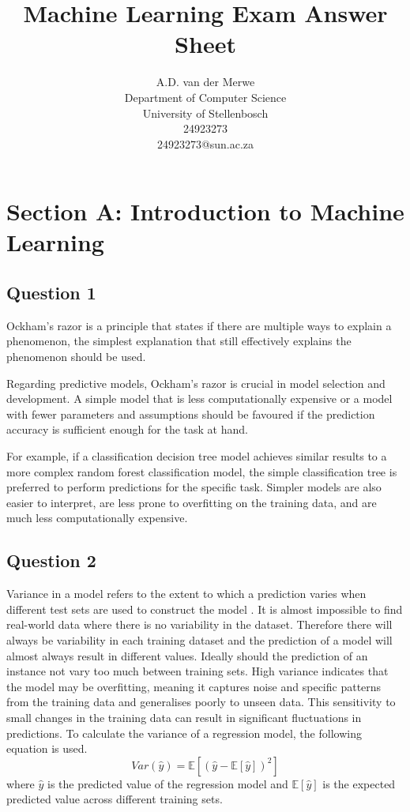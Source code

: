 \documentclass[10pt]{article}
\title{Machine Learning Exam Answer Sheet}
\author{
    A.D. van der Merwe\\
    Department of Computer Science \\
    University of Stellenbosch\\
    24923273 \\
    24923273@sun.ac.za
}
\begin{document}
\maketitle

\section*{Section A: Introduction to Machine Learning}

\subsection*{Question 1}

Ockham's razor is a principle that states if there are multiple ways to explain
a phenomenon, the simplest explanation that still effectively explains the phenomenon
should be used.

Regarding predictive models, Ockham's razor is crucial in model selection and
development. A simple model that is less computationally expensive or a model with fewer
parameters and assumptions should be favoured if the prediction accuracy is sufficient enough
for the task at hand.

For example, if a classification decision tree model achieves similar results
to a more complex random forest classification model, the simple classification tree is preferred
to perform predictions for the specific task. Simpler models are also easier to interpret,
are less prone to overfitting on the training data, and are much less computationally expensive.

\subsection*{Question 2}

Variance in a model refers to the extent to which a prediction varies when
different test sets are used to construct the model \cite{ISLP}. It is almost impossible to find real-world data
where there is no variability in the dataset. Therefore there will always be variability in each training
dataset and the prediction of a model will almost always result in different values. Ideally
should the prediction of an instance not vary too much between training sets. High variance indicates that the
model may be overfitting, meaning it captures noise and specific patterns from the training data and
generalises poorly to unseen data. This sensitivity to small changes in the training data can result
in significant fluctuations in predictions. To calculate the variance of a regression model, the following equation is used.
\begin{equation}
    Var(\hat{y}) = \mathbb{E}\left[ \left( \hat{y} - \mathbb{E}\left[ \hat{y} \right] \right)^2 \right]
\end{equation}
where $\hat{y}$ is the predicted value of the regression model and $\mathbb{E}\left[ \hat{y} \right]$ is the
expected predicted value across different training sets.
\end{document}
